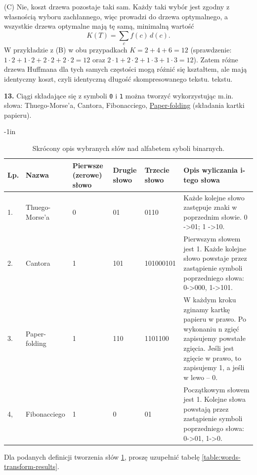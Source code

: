 \documentclass[twoside]{article}
\begin{document}
(C) Nie, koszt drzewa pozostaje taki sam. Każdy taki wybór jest zgodny z własnością wyboru zachłannego, więc prowadzi do drzewa optymalnego, a wszystkie drzewa optymalne mają tę samą, minimalną wartość
\[
  K(T)=\sum_{c} f(c)\,d(c).
\]
W przykładzie z (B) w obu przypadkach $K = 2+4+6 = 12$ (sprawdzenie: $1\cdot2+1\cdot2+2\cdot2+2\cdot2=12$ oraz $2\cdot1+2\cdot2+1\cdot3+1\cdot3=12$). Zatem różne drzewa Huffmana dla tych samych częstości mogą różnić się kształtem, ale mają identyczny koszt, czyli identyczną długość skompresowanego tekstu. tekstu.
\newline

\textbf{13.} Ciągi składające się z symboli \verb|0| i \verb|1| można tworzyć wykorzystując 
m.in. słowa: Thuego-Morse'a, Cantora, Fibonacciego, \href{https://googlethatforyou.com?q=Regular%20paperfolding%20sequence}{Paper-folding} (składania kartki papieru).

\begin{table}[h!]
\begin{adjustwidth}{-1in}{} 
\begin{tabular}{|l|l|p{1.5cm}|p{1.5cm}|l|p{5cm}|}
\hline
Lp. & Nazwa & Pierwsze (zerowe) słowo & Drugie słowo & Trzecie słowo & Opis wyliczania i-tego słowa \\ \hline
1. & Thuego-Morse'a & 0 & 01 & 0110 & Każde kolejne słowo zastępuje znaki w poprzednim słowie. 0 -\textgreater 01; 1 -\textgreater{}10. \\ \hline
2. & Cantora & 1 & 101 & 101000101 & Pierwszym słowem jest 1. Każde kolejne słowo powstaje przez zastąpienie symboli poprzedniego słowa: 0-\textgreater{}000, 1-\textgreater{}101. \\ \hline
3. & Paper-folding & 1 & 110 & 1101100 & W każdym kroku zginamy kartkę papieru w prawo. Po wykonaniu n zgięć zapisujemy powstałe zgięcia. Jeśli jest zgięcie w prawo, to zapisujemy 1, a jeśli w lewo -- 0. \\ \hline
4, & Fibonacciego & 1 & 0 & 01 & Początkowym słowem jest 1. Kolejne słowa powstają przez zastąpienie symboli poprzedniego słowa: 0-\textgreater{}01, 1-\textgreater{}0. \\ \hline
\end{tabular}
\end{adjustwidth}
\caption{Skrócony opis wybranych słów nad alfabetem syboli binarnych.}
\label{table:words-transform-description}
\end{table}

Dla podanych definicji tworzenia słów \ref{table:words-transform-description}, proszę uzupełnić tabelę \ref{table:words-transform-results}.
\newline
\end{document}
